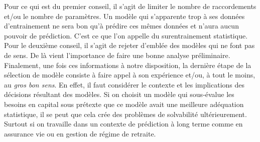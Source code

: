 	Pour ce qui est du premier conseil, il s'agit de limiter le nombre de raccordements et/ou le nombre de paramètres. Un modèle qui s'apparente trop à ses données d'entrainement ne sera bon qu'à prédire ces mêmes données et n'aura aucun pouvoir de prédiction. C'est ce que l'on appelle du surentrainement statistique.\\
	
	Pour le deuxième conseil, il s'agit de rejeter d'emblée des modèles qui ne font pas de sens. De là vient l'importance de faire une bonne analyse préliminaire.\\
	
	Finalement, une fois ces informations à notre disposition, la dernière étape de la sélection de modèle consiste à faire appel à son expérience et/ou, à tout le moins, au \textit{gros bon sens}.
	En effet, il faut considérer le contexte et les implications des décisions résultant des modèles. Si on choisit un modèle qui sous-évalue les besoins en capital sous prétexte que ce modèle avait une meilleure adéquation statistique, il se peut que cela crée des problèmes de solvabilité ultérieurement. Surtout si on travaille dans un contexte de prédiction à long terme comme en assurance vie ou en gestion de régime de retraite.
